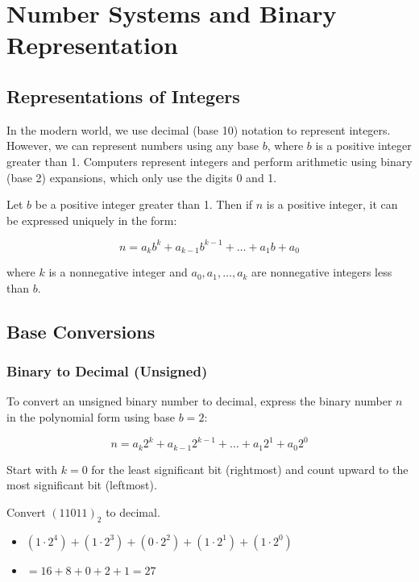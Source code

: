 \chapter{Number Systems and Binary Representation}

\section{Representations of Integers}
In the modern world, we use decimal (base 10) notation to represent integers. However, we can represent numbers using any base $b$, where $b$ is a positive integer greater than 1. Computers represent integers and perform arithmetic using binary (base 2) expansions, which only use the digits 0 and 1.

\begin{theorem}
Let $b$ be a positive integer greater than 1. Then if $n$ is a positive integer, it can be expressed uniquely in the form:

\[ n = a_k b^k + a_{k-1} b^{k-1} + \dots + a_1 b + a_0 \]

where $k$ is a nonnegative integer and $a_0, a_1, \dots, a_k$ are nonnegative integers less than $b$.
\end{theorem}

\section{Base Conversions}

\subsection{Binary to Decimal (Unsigned)}
To convert an unsigned binary number to decimal, express the binary number $n$ in the polynomial form using base $b=2$:

\[ n = a_k 2^k + a_{k-1} 2^{k-1} + \dots + a_1 2^1 + a_0 2^0 \]

Start with $k=0$ for the least significant bit (rightmost) and count upward to the most significant bit (leftmost).

\begin{example}
Convert $(11011)_2$ to decimal.

\begin{itemize}
    \item $(1 \cdot 2^4) + (1 \cdot 2^3) + (0 \cdot 2^2) + (1 \cdot 2^1) + (1 \cdot 2^0)$
    \item $= 16 + 8 + 0 + 2 + 1 = 27$
\end{itemize}

\end{example}

